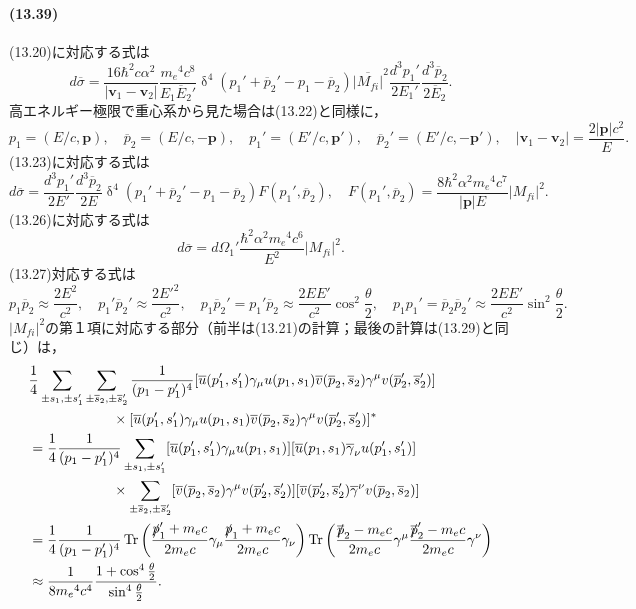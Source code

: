\paragraph{(13.39)}
(13.20)に対応する式は
\[d\overline{\sigma} = \frac{16\hbar^2c\alpha^2}{\lvert\boldsymbol{v}_1 -\boldsymbol{v}_2\rvert} \frac{m_e{}^4c^8}{E_1\overline{E}_2'} \operatorname{\delta}^4(p_1' + \overline{p}_2' - p_1 - \overline{p}_2) \overline{\lvert M_{fi}\rvert}^2 \frac{d^3p_1'}{2E_1'} \frac{d^3\overline{p}_2}{2\overline{E}_2}.\]
高エネルギー極限で重心系から見た場合は(13.22)と同様に，
\[ p_1 = (E/c, \boldsymbol{p}),\quad \overline{p}_2 = (E/c, -\boldsymbol{p}),\quad p_1' = (E'/c, \boldsymbol{p}'),\quad \overline{p}_2' = (E'/c, -\boldsymbol{p}'),\quad \lvert\boldsymbol{v}_1 - \boldsymbol{v}_2 \rvert = \frac{2\lvert\boldsymbol{p}\rvert c^2}{E}. \]
(13.23)に対応する式は
\[d\overline{\sigma} = \frac{d^3p_1'}{2E'} \frac{d^3\overline{p}_2}{2E} \operatorname{\delta}^4(p_1' + \overline{p}_2' - p_1 - \overline{p}_2) F(p_1', \overline{p}_2),\quad F(p_1', \overline{p}_2) = \frac{8\hbar^2\alpha^2m_e{}^4c^7}{\lvert\boldsymbol{p}\rvert E} \lvert M_{fi}\rvert^2. \]
(13.26)に対応する式は
\[d\overline{\sigma} = d\Omega_1'\frac{\hbar^2\alpha^2m_e{}^4c^6}{E^2} \lvert M_{fi}\rvert^2. \]
(13.27)対応する式は
\[ p_1\overline{p}_2 \approx \frac{2E^2}{c^2},\quad p_1'\overline{p}_2' \approx \frac{2E'^2}{c^2},\quad p_1\overline{p}_2' = p_1'\overline{p}_2 \approx \frac{2EE'}{c^2}\cos^2\frac{\theta}{2},\quad p_1p_1' = \overline{p}_2\overline{p}_2' \approx \frac{2EE'}{c^2}\sin^2\frac{\theta}{2}. \]
$\lvert M_{fi}\rvert^2$の第１項に対応する部分（前半は(13.21)の計算；最後の計算は(13.29)と同じ）は，
\begin{align*}
  & \frac{1}{4} \sum_{\pm s_1, \pm s_1'} \sum_{\pm \overline{s}_2, \pm\overline{s}_2'} \frac{1}{(p_1 - p_1')^4} [\overline{u}(p_1', s_1') \gamma_\mu u(p_1, s_1) \overline{v}(\overline{p}_2, \overline{s}_2) \gamma^\mu v(\overline{p}_2', \overline{s}_2')] \\
  &\qquad\qquad\qquad \times [\overline{u}(p_1', s_1') \gamma_\mu u(p_1, s_1) \overline{v}(\overline{p}_2, \overline{s}_2) \gamma^\mu v(\overline{p}_2', \overline{s}_2')]^* \\
  & = \frac{1}{4} \frac{1}{(p_1 - p_1')^4} \sum_{\pm s_1, \pm s_1'} [\overline{u}(p_1', s_1') \gamma_\mu u(p_1, s_1)] [\overline{u}(p_1, s_1) \overline{\gamma}_\nu u(p_1', s_1')] \\
  &\qquad\qquad\qquad \times \sum_{\pm \overline{s}_2, \pm\overline{s}_2'} [\overline{v}(\overline{p}_2, \overline{s}_2) \gamma^\mu v(\overline{p}_2', \overline{s}_2')] [\overline{v}(\overline{p}_2', \overline{s}_2') \overline{\gamma}^\nu v(\overline{p}_2, \overline{s}_2)] \\
  & = \frac{1}{4} \frac{1}{(p_1-p_1')^4} \operatorname{Tr} \left( \frac{\slashed{p}_1'+m_ec}{2m_ec} \gamma_\mu \frac{\slashed{p}_1+m_ec}{2m_ec} \gamma_\nu \right) \operatorname{Tr} \left( \frac{\slashed{\overline{p}}_2 - m_ec}{2m_ec} \gamma^\mu \frac{\slashed{\overline{p}}_2' - m_ec}{2m_ec} \gamma^\nu \right) \\
  & \approx \frac{1}{8m_e{}^4c^4}\frac{1+\cos^4\frac{\theta}{2}}{\sin^4\frac{\theta}{2}}.
\end{align*}
